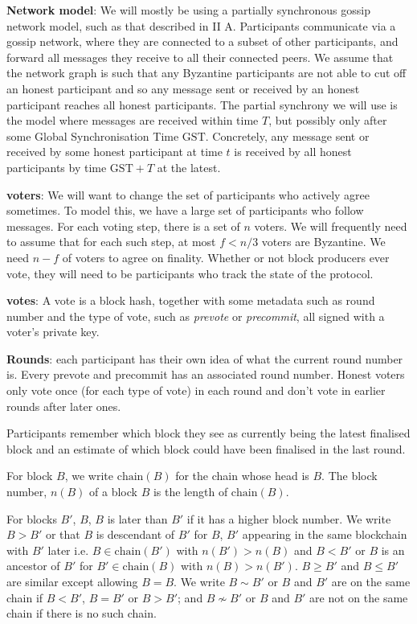 \documentclass{article}
\def\GST{\mathrm{GST}}
\begin{document}
{\bf Network model}: We will mostly be using a partially synchronous gossip network model, such as that described in \cite{Tendermint} II A.
Participants communicate via a gossip network, where they are connected to a subset of other participants, and forward all messages they receive to all their connected peers.
We assume that the network graph is such that any Byzantine participants are not able to cut off an honest participant and so any message sent or received by an honest participant reaches all honest participants.
The partial synchrony we will use is the model where messages are received within time $T$, but possibly only after some Global Synchronisation Time $\GST$.
Concretely, any message sent or received by some honest participant at time $t$ is received by all honest participants by time $\GST+T$ at the latest.


{\bf voters}: We will want to change the set of participants who actively agree sometimes. To model this, we have a large set of participants who follow messages.
For each voting step, there is a set of $n$ voters.
We will frequently need to assume that for each such step, at most  $f < n/3$ voters are Byzantine.
We need $n-f$ of voters to agree on finality. Whether or not block producers ever vote, they will need to be participants who track the state of the protocol.

{\bf votes}: A vote is a block hash, together with some metadata such as round number and the type of vote, such as {\em prevote} or {\em precommit}, all signed with a voter's private key.

{\bf Rounds}: each participant has their own idea of what the current round number is. Every prevote and precommit has an associated round number. Honest voters only vote once (for each type of vote) in each round and don't vote in earlier rounds after later ones.

Participants remember which block they see as currently being the latest finalised block and an estimate of which block could have been finalised in the last round.




For block $B$, we write $\mathrm{chain}(B)$ for the chain whose head is $B$. The block number, $n(B)$ of a block $B$ is the length of $\mathrm{chain}(B)$.

For blocks $B'$, $B$, $B$ is later than $B'$ if it has a higher block number.
We write $B > B'$ or that $B$ is descendant of $B'$ for $B$, $B'$ appearing in the same blockchain with $B'$ later i.e. $B \in \mathrm{chain}(B')$ with $n(B') > n(B)$ and $B < B'$ or $B$ is an ancestor of $B'$ for $B' \in \mathrm{chain}(B)$ with $n(B) > n(B')$.
$B \geq B'$ and $B \leq B'$ are similar except allowing $B = B$.
We write $B \sim B'$ or $B$ and $B'$ are on the same chain if $B<B'$, $B=B'$ or $B> B'$; and $B \nsim B'$ or $B$ and $B'$ are not on the same chain if there is no such chain.
\end{document}
